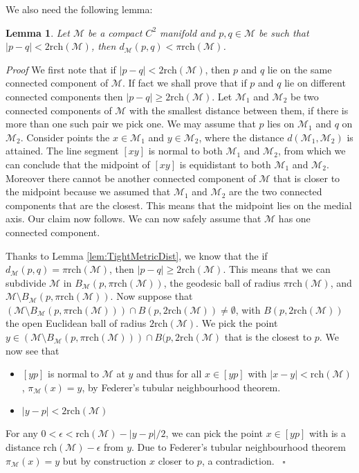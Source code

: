 \documentclass{article}
\newenvironment{proof}[1][{}]{%
  \begin{trivlist}\item[]\textit{Proof #1}\quad}%
  {\hfill\hspace*{\fill}~$\square$\end{trivlist}}
\newtheorem{lemma}[theorem]{Lemma}
\newcommand{\M}{\mathcal{M}}
\newcommand{\rch}{\mathrm{rch}}
\begin{document}
We also need the following lemma:
\begin{lemma}
\label{lem:ConditionAmbientSpace} 
Let $\M$ be a compact $C^2$ manifold and $p,q \in \M $ be such that $|p-q| < 2 \rch(\M)$, then $d_\M (p,q) < \pi \rch(\M)$.
\end{lemma}
\begin{proof}
We first note that if $|p-q| < 2 \rch (\M)$, then $p$ and $q$ lie on the same connected component of $\M$. If fact we shall prove that if $p$ and $q$ lie on different connected components then $|p-q| \geq 2 \rch(\M)$. Let $\M_1$ and $\M_2$ be two connected components of $\M$ with the smallest distance between them, if there is more than one such pair we pick one. We may assume that $p$ lies on $\M_1$ and $q$ on $\M_2$. Consider points the $x \in \M_1$ and $y \in  \M_2$, where the distance $d(\M_1,\M_2)$ is attained. The line segment $[xy]$ is normal to both $\M_1$ and $\M_2$, from which we can conclude that the midpoint of $[xy]$ is equidistant to both $\M_1$ and $\M_2$. Moreover there cannot be another connected component of $\M$ that is closer to the midpoint because we assumed that $\M_1$ and $\M_2$ are the two connected components that are the closest. This means that the midpoint lies on the medial axis. Our claim now follows. We can now safely assume that $\M$ has one connected component.

Thanks to Lemma \ref{lem:TightMetricDist}, we know that the if $d_\M(p,q) = \pi \rch(\M)$, then $|p-q|\geq 2 \rch(\M)$. This means that we can subdivide $\M$ in $B_{\M}(p,\pi \rch(\M))$, the geodesic ball of radius $\pi \rch(\M)$, and $\M \setminus B_{\M}(p,\pi \rch(\M))$. Now suppose that $(\M \setminus B_{\M}(p,\pi \rch(\M))) \cap B(p, 2 \rch(\M)) \neq \emptyset$, with $B(p, 2 \rch(\M))$ the open Euclidean ball of radius $2 \rch(\M)$. We pick the point $y \in (\M \setminus B_{\M}(p,\pi \rch(\M))) \cap B(p, 2 \rch(\M)$ that is the closest to $p$. We now see that
\begin{itemize}
\item $[yp]$ is normal to $\M$ at $y$ and thus for all $x \in [yp]$ with $|x-y| < \rch(\M)$, $\pi_\M (x)= y$, by Federer's tubular neighbourhood theorem.
\item $|y-p| < 2 \rch (\M)$
\end{itemize} 
For any $0 <\epsilon < \rch(\M) -|y-p|/2$, we can pick the point $x \in [yp]$ with is a distance $\rch(\M)-\epsilon$ from $y$. Due to Federer's tubular neighbourhood theorem $\pi_\M (x) =y$ but by construction $x$ closer to $p$, a contradiction. 
\end{proof}
\end{document}
